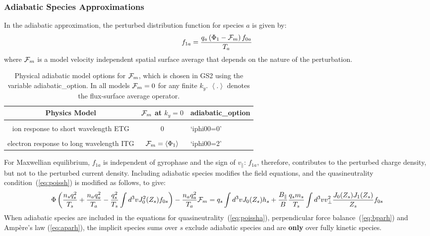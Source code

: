 \documentclass[10pt,a4paper]{article}
\newcommand{\gradpar}{\nabla_{\parallel}}
\newcommand{\flav}[1]{\left\langle{#1}\right\rangle}
\begin{document}
\subsubsection{Adiabatic Species Approximations}

In the adiabatic approximation, the perturbed distribution function for
species $a$ is given by:
\begin{equation} 
f_{1a} = \frac{q_a \left(\Phi_1 - {\cal F}_m \right) f_{0a}}{T_a} 
\end{equation}
where ${\cal F}_m$ is a model velocity independent spatial surface average
that depends on the nature of the perturbation.

\begin{table}[h]
\begin{center}
 \begin{tabular}{|ccl|}
\hline
Physics Model & ${\cal F}_{m}$ at $k_y=0$ & adiabatic\_option \\
\hline
& & \\
ion response to short wavelength ETG &  0 & `iphi00=0' \\ & & \\
electron response to long wavelength ITG & ${\cal F}_{m} = \flav{\Phi_1}$ & `iphi00=2' \\
\hline
\end{tabular}
\end{center}
\caption{\label{tab:adgs2} Physical adiabatic model options for ${\cal F}_m$,
  which is chosen in GS2 using the variable adiabatic\_option. In all models
  ${\cal F}_m = 0$ for any finite $k_y$. $\flav{.}$ denotes the flux-surface
  average operator.}
\end{table}

For Maxwellian equilibrium, $f_{1a}$ is independent of gyrophase and the sign
of $v_{\parallel}$: $f_{1a}$, therefore, contributes to the perturbed charge
density, but not to the perturbed current density.  Including adiabatic
species modifies the field equations, and the quasineutrality
condition~(\ref{eq:poissh}) is modified as follows, to give: \small
\begin{align}
  \Phi \left( \frac{n_s q_s^2}{T_s} + \frac{n_a q_a^2}{T_a} -
    \frac{q_s^2}{T_s} \int d^3v J_0^2(Z_s) f_{0s} \right) - \frac{n_a
    q_a^2}{T_a} {\cal F}_m = q_s \int d^3v J_0(Z_s) h_s +
  \frac{B_{\parallel}}{B} \frac{q_s m_s}{T_s} \int d^3v v_{\perp}^2
  \frac{J_0(Z_s) J_1(Z_s)}{Z_s} f_{0s} \label{eq:poissha}
\end{align}
\normalsize When adiabatic species are included in the equations for
quasineutrality~(\ref{eq:poissha}), perpendicular force
balance~(\ref{eq:bparh}) and Amp\`ere's law (\ref{eq:aparh}), the implicit
species sums over $s$ exclude adiabatic species and are \textbf{only} over
fully kinetic species.
\end{document}
